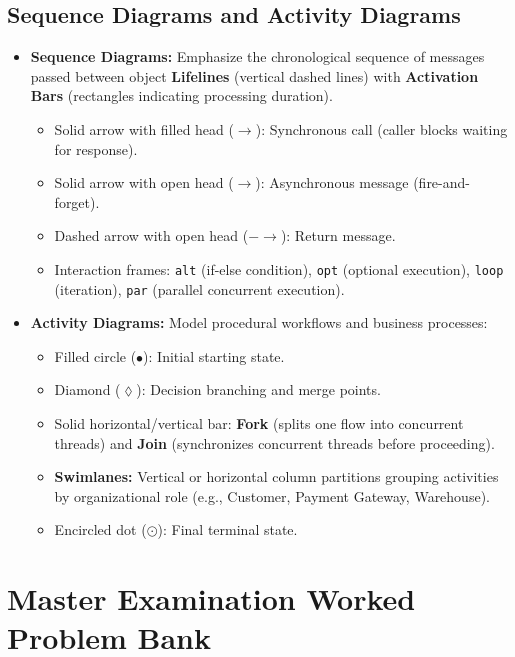 \subsection{Sequence Diagrams and Activity Diagrams}
\begin{itemize}
    \item \textbf{Sequence Diagrams:} Emphasize the chronological sequence of messages passed between object \textbf{Lifelines} (vertical dashed lines) with \textbf{Activation Bars} (rectangles indicating processing duration).
    \begin{itemize}
        \item Solid arrow with filled head ($\longrightarrow$): Synchronous call (caller blocks waiting for response).
        \item Solid arrow with open head ($\longrightarrow$): Asynchronous message (fire-and-forget).
        \item Dashed arrow with open head ($-\rightarrow$): Return message.
        \item Interaction frames: \texttt{alt} (if-else condition), \texttt{opt} (optional execution), \texttt{loop} (iteration), \texttt{par} (parallel concurrent execution).
    \end{itemize}
    \item \textbf{Activity Diagrams:} Model procedural workflows and business processes:
    \begin{itemize}
        \item Filled circle ($\bullet$): Initial starting state.
        \item Diamond ($\lozenge$): Decision branching and merge points.
        \item Solid horizontal/vertical bar: \textbf{Fork} (splits one flow into concurrent threads) and \textbf{Join} (synchronizes concurrent threads before proceeding).
        \item \textbf{Swimlanes:} Vertical or horizontal column partitions grouping activities by organizational role (e.g., Customer, Payment Gateway, Warehouse).
        \item Encircled dot ($\odot$): Final terminal state.
    \end{itemize}
\end{itemize}



\section{Master Examination Worked Problem Bank}
\label{sec:se_worked_problems}

